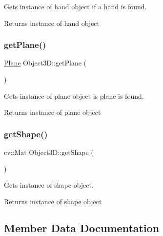 Gets instance of hand object if a hand is found. 

\begin{DoxyReturn}{Returns}
instance of hand object 
\end{DoxyReturn}
\hypertarget{class_object3_d_a25fb10b8403446f7b8a0cb76a1ec97a2}{}\label{class_object3_d_a25fb10b8403446f7b8a0cb76a1ec97a2} 
\subsubsection{\texorpdfstring{get\+Plane()}{getPlane()}}
{\footnotesize\ttfamily \hyperlink{class_plane}{Plane} Object3\+D\+::get\+Plane (\begin{DoxyParamCaption}{ }\end{DoxyParamCaption})}



Gets instance of plane object is plane is found. 

\begin{DoxyReturn}{Returns}
instance of plane object 
\end{DoxyReturn}
\hypertarget{class_object3_d_a234a43ffebe47852173649465476e2ec}{}\label{class_object3_d_a234a43ffebe47852173649465476e2ec} 
\subsubsection{\texorpdfstring{get\+Shape()}{getShape()}}
{\footnotesize\ttfamily cv\+::\+Mat Object3\+D\+::get\+Shape (\begin{DoxyParamCaption}{ }\end{DoxyParamCaption})}



Gets instance of shape object. 

\begin{DoxyReturn}{Returns}
instance of shape object 
\end{DoxyReturn}


\subsection{Member Data Documentation}
\hypertarget{class_object3_d_abb8332580980c9ed85c43faf1f25cb0f}{}\label{class_object3_d_abb8332580980c9ed85c43faf1f25cb0f} 
